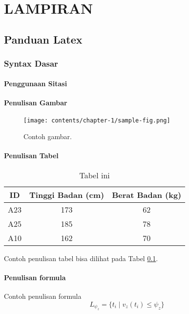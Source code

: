 \chapter*{LAMPIRAN}

\section{Panduan Latex}

\subsection{Syntax Dasar}



\subsubsection{Penggunaan Sitasi}

\subsubsection{Penulisan Gambar}

\begin{figure}[h]
	\centering
	\texttt{[image: contents/chapter-1/sample-fig.png]}
	\caption{Contoh gambar.}
	\label{Fig: Contoh gambar}
\end{figure}

\subsubsection{Penulisan Tabel}
\begin{table}[h]
	\caption{Tabel ini}
	\vspace{0.5em}
	\centering
	\begin{tabular}{|c|c|c|}
		\hline
		ID & Tinggi Badan (cm) & Berat Badan (kg) \\
		\hline \hline
		A23 & 173 & 62 \\
		A25 & 185 & 78 \\
		A10 & 162 & 70 \\ \hline
	\end{tabular}
	\label{Tab: Tabel Tinggi Berat}
\end{table}
Contoh penulisan tabel bisa dilihat pada Tabel \ref{Tab: Tabel Tinggi Berat}.

\subsubsection{Penulisan formula}
Contoh penulisan formula
\begin{equation}
	L_{\psi_z} = \{ t_i \mid v_z(t_i) \le \psi_z \}
\end{equation}

